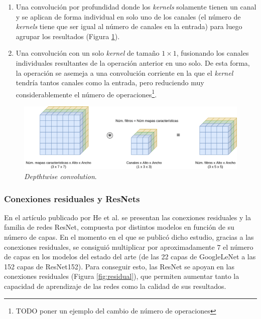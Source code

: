 \begin{itemize}
\begin{enumerate}
\item Una convolución por profundidad donde los \textit{kernels} solamente tienen un canal y se aplican de forma individual en solo uno de los canales (el número de \textit{kernels} tiene que ser igual al número de canales en la entrada) para luego agrupar los resultados (Figura \ref{fig:convolucion-depthwise}).
\item Una convolución con un solo \textit{kernel} de tamaño $1\times1$, fusionando los canales individuales resultantes de la operación anterior en uno solo. De esta forma, la operación se asemeja a una convolución corriente en la que el \textit{kernel} tendría tantos canales como la entrada, pero reduciendo muy considerablemente el número de operaciones\footnote{TODO poner un ejemplo del cambio de número de operaciones}.
\end{enumerate}

\begin{figure}[H]
\centering
\includegraphics[width=0.9\linewidth]{imagenes/convolucion-depthwise.png} 
\captionsetup{width=.9\linewidth}
\caption{\textit{Depthtwise convolution}.}
\label{fig:convolucion-depthwise}
\end{figure}

\end{itemize}

\subsubsection{Conexiones residuales y ResNets}

En el artículo publicado por He et al. \cite{resnet} se presentan las conexiones residuales y la familia de redes ResNet, compuesta por distintos modelos en función de su número de capas. En el momento en el que se publicó dicho estudio, gracias a las conexiones residuales, se consiguió multiplicar por aproximadamente $7$ el número de capas en los modelos del estado del arte (de las 22 capas de GoogleLeNet \cite{googlelenet} a las 152 capas de ResNet152). Para conseguir esto, las ResNet se apoyan en las conexiones residuales (Figura \ref{fig:residual}), que permiten aumentar tanto la capacidad de aprendizaje de las redes como la calidad de sus resultados.

